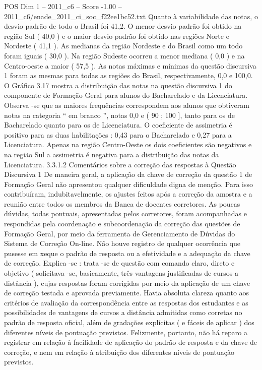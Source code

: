 \begin{textsample}{POS Dim 1 – 2011\_c6 – Score -1.00 – 2011\_c6/enade\_2011\_ci\_soc\_f22ee1bc52.txt}
Quanto à variabilidade das notas, o desvio padrão de todo o Brasil foi 41,2.
O menor desvio padrão foi obtido na região Sul ( 40,0 ) e o maior desvio padrão foi obtido nas regiões Norte e Nordeste ( 41,1 ).
As medianas da região Nordeste e do Brasil como um todo foram iguais ( 30,0 ).
Na região Sudeste ocorreu a menor mediana ( 0,0 ) e na Centro-oeste a maior ( 57,5 ).
As notas máximas e mínimas da questão discursiva 1 foram as mesmas para todas as regiões do Brasil, respectivamente, 0,0 e 100,0.
O Gráfico 3.17 mostra a distribuição das notas na questão discursiva 1 do componente de Formação Geral para alunos do Bacharelado e da Licenciatura.
Observa -se que as maiores frequências correspondem aos alunos que obtiveram notas na categoria “ em branco ”, notas 0,0 e ( 90 ; 100 ], tanto para os de Bacharelado quanto para os de Licenciatura.
O coeficiente de assimetria é positivo para as duas habilitações : 0,43 para o Bacharelado e 0,27 para a Licenciatura.
Apenas na região Centro-Oeste os dois coeficientes são negativos e na região Sul a assimetria é negativa para a distribuição das notas da Licenciatura. 3.3.1.2 Comentários sobre a correção das respostas à Questão Discursiva 1 De maneira geral, a aplicação da chave de correção da questão 1 de Formação Geral não apresentou qualquer dificuldade digna de menção.
Para isso contribuíram, indubitavelmente, os ajustes feitos após a correção da amostra e a reunião entre todos os membros da Banca de docentes corretores.
As poucas dúvidas, todas pontuais, apresentadas pelos corretores, foram acompanhadas e respondidas pela coordenação e subcoordenação da correção das questões de Formação Geral, por meio da ferramenta de Gerenciamento de Dúvidas do Sistema de Correção On-line.
Não houve registro de qualquer ocorrência que pusesse em xeque o padrão de resposta ou a efetividade e a adequação da chave de correção.
Explica -se : trata -se de questão com comando claro, direto e objetivo ( solicitava -se, basicamente, três vantagens justificadas de cursos a distância ), cujas respostas foram corrigidas por meio da aplicação de um chave de correção testada e aprovada previamente.
Havia absoluta clareza quanto aos critérios de avaliação da correspondência entre as respostas dos estudantes e as possibilidades de vantagens de cursos a distância admitidas como corretas no padrão de resposta oficial, além de gradações explícitas ( e fáceis de aplicar ) dos diferentes níveis de pontuação previstos.
Felizmente, portanto, não há reparo a registrar em relação à facilidade de aplicação do padrão de resposta e da chave de correção, e nem em relação à atribuição dos diferentes níveis de pontuação previstos.

\end{textsample}
